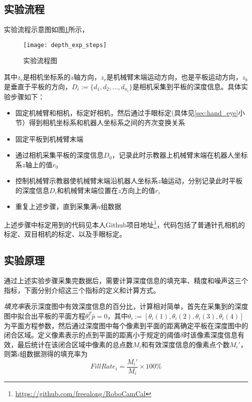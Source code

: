 \subsection{实验流程}
实验流程示意图如图\ref{fig:depth_exp_steps}所示，
\begin{figure}[ht]
  \centering
  \texttt{[image: depth\_exp\_steps]}
  \caption{实验流程图}
  \label{fig:depth_exp_steps}
\end{figure}
其中$z_c$是相机坐标系的$z$轴方向，$z_r$是机械臂末端运动方向，也是平板运动方向，$z_b$是垂直于平板的方向，$D_i:=\{d_1,d_2,…,d_{n_i}\}$是相机采集到平板的深度信息。具体实验步骤如下：
\begin{itemize}
\item 固定机械臂和相机，标定好相机，然后通过手眼标定(具体见\ref{sec:hand_eye}小节）得到相机坐标系和机器人坐标系之间的齐次变换关系
\item 固定平板到机械臂末端
\item 通过相机采集平板的深度信息$D_0$，记录此时示教器上机械臂末端在机器人坐标系$z$轴上的值$r_0$
\item 控制机械臂示教器使机械臂末端沿机器人坐标系$z$轴运动，分别记录此时平板的深度信息$D_i$和机械臂末端位置在$z$方向上的值$r_i$
\item 重复上述步骤，直到采集满$n$组数据
\end{itemize}
上述步骤中标定用到的代码见本人Github项目地址\footnote{\url{https://github.com/freealong/RoboCamCal}}，代码包括了普通针孔相机的标定、双目相机的标定、以及手眼标定。

\subsection{实验原理}
通过上述实验步骤采集完数据后，需要计算深度信息的填充率、精度和噪声这三个指标，下面分别介绍这三个指标的定义和计算方式。

\emph{填充率}表示深度图中有效深度信息的百分比，计算相对简单，首先在采集到的深度图中拟合出平板的平面方程$\theta_i^T\bar{p}=0$，其中$\theta_i := [\theta_i(1), \theta_i(2), \theta_i(3), \theta_i(4)]$为平面方程参数，然后通过深度图中每个像素到平面的距离确定平板在深度图中的闭合区域。定义像素表示的点到平面的距离小于规定的阈值$\delta$时该像素深度信息有效，最后统计在该闭合区域中像素的总点数$M_i$和有效深度信息的像素点个数$M_i'$，则第$i$组数据测得的填充率为
\begin{equation}
  FillRate_i = \frac{M_i'}{M_i} \times 100\%
\end{equation}

